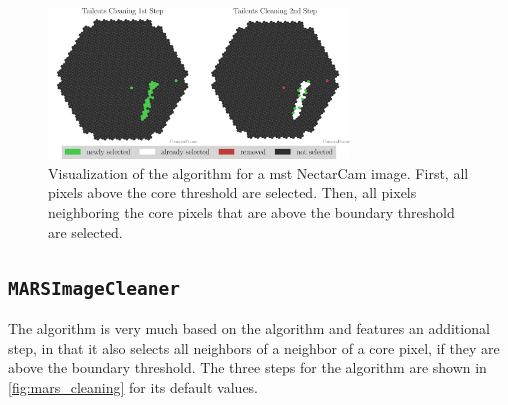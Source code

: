\begin{figure}
    \centering
    \includegraphics[height=4cm]{plots/cleaner_steps/tailcuts.pdf}
    \caption{Visualization of the \tailcuts{} algorithm for a \gls{mst} NectarCam image. First, all
    pixels above the core threshold are selected. Then, all pixels neighboring the core
    pixels that are above the boundary threshold are selected.}
    \label{fig:tailcuts_clean}
\end{figure}

\subsection{\texttt{MARSImageCleaner}}
\vspace{-0.5cm}
The \mars{} algorithm \cite{mars} is very much based on the \tailcuts{}
algorithm and features an additional step, in that it also selects all neighbors of a neighbor of a
core pixel, if they are above the boundary threshold. The three steps for the \mars{} algorithm
are shown in \autoref{fig:mars_cleaning} for its default values.

